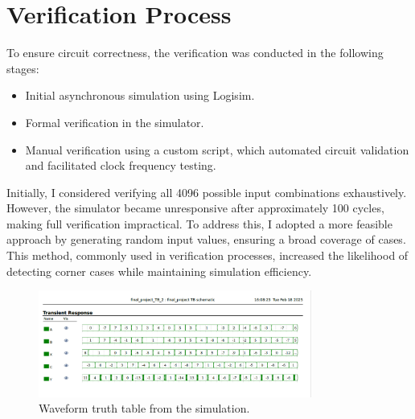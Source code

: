 \documentclass[a4paper,12pt]{article}
\begin{document}
\section{Verification Process}
To ensure circuit correctness, the verification was conducted in the following stages:
\begin{itemize}
    \item Initial asynchronous simulation using Logisim.
    \item Formal verification in the simulator.
    \item Manual verification using a custom script, which automated circuit validation and facilitated clock frequency testing.
\end{itemize}

Initially, I considered verifying all 4096 possible input combinations exhaustively. However, the simulator became unresponsive after approximately 100 cycles, making full verification impractical. To address this, I adopted a more feasible approach by generating random input values, ensuring a broad coverage of cases. This method, commonly used in verification processes, increased the likelihood of detecting corner cases while maintaining simulation efficiency.

\begin{figure}[H]
    \centering
    \includegraphics[width=0.8\textwidth]{graphs/wave_truth_table.png}
    \caption{Waveform truth table from the simulation.}
\end{figure}
\end{document}
